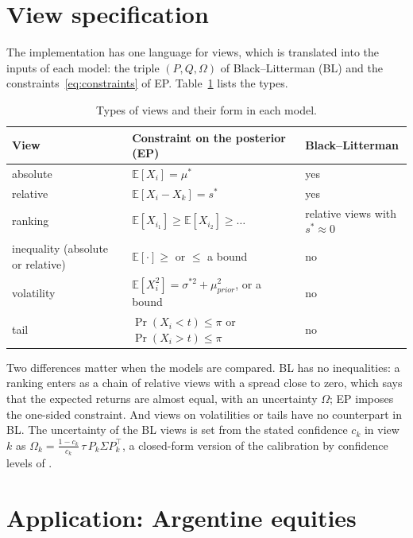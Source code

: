 \documentclass[11pt]{article}
\newcommand{\E}{\mathbb{E}}
\begin{document}
\section{View specification}\label{sec:views}

The implementation has one language for views, which is translated into the
inputs of each model: the triple $(P, Q, \Omega)$ of Black--Litterman (BL)
and the constraints~\eqref{eq:constraints} of EP. Table~\ref{tab:views}
lists the types.

\begin{table}[t]
\centering
\small
\caption{Types of views and their form in each model.}
\label{tab:views}
\begin{tabular}{lll}
\toprule
View & Constraint on the posterior (EP) & Black--Litterman \\
\midrule
absolute & $\E[X_i] = \mu^\ast$ & yes \\
relative & $\E[X_i - X_k] = s^\ast$ & yes \\
ranking & $\E[X_{i_1}] \ge \E[X_{i_2}] \ge \dots$ & relative views with $s^\ast \approx 0$ \\
inequality (absolute or relative) & $\E[\cdot] \ge$ or $\le$ a bound & no \\
volatility & $\E[X_i^2] = \sigma^{\ast 2} + \mu_{prior}^2$, or a bound & no \\
tail & $\Pr(X_i < t) \le \pi$ or $\Pr(X_i > t) \le \pi$ & no \\
\bottomrule
\end{tabular}
\end{table}

Two differences matter when the models are compared. BL has no
inequalities: a ranking enters as a chain of relative views with a spread
close to zero, which says that the expected returns are almost equal, with
an uncertainty $\Omega$; EP imposes the one-sided constraint. And views on
volatilities or tails have no counterpart in BL. The uncertainty of the BL
views is set from the stated confidence $c_k$ in view $k$ as
$\Omega_k = \frac{1-c_k}{c_k}\,\tau\, P_k \Sigma P_k^\top$, a closed-form
version of the calibration by confidence levels of \citet{Idzorek2007}.

\section{Application: Argentine equities}\label{sec:empirical}
\end{document}
